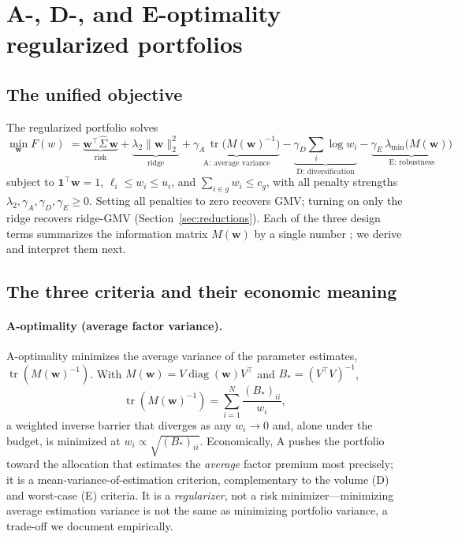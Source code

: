 \documentclass[11pt]{article}
\newcommand{\Sighat}{\hat\Sigma}
\newcommand{\tr}{\operatorname{tr}}
\newcommand{\diag}{\operatorname{diag}}
\newcommand{\one}{\mathbf{1}}
\newcommand{\w}{\mathbf{w}}
\newcommand{\M}{M(\w)}
\newcommand{\lammin}{\lambda_{\min}}
\begin{document}
\section{A-, D-, and E-optimality regularized portfolios}
\label{sec:criteria}
\subsection{The unified objective}
The regularized portfolio solves
\begin{equation}
  \min_{\w} F(w) \; =
  \underbrace{\w^\top\Sighat\,\w}_{\text{risk}}
  +\underbrace{\lambda_2\lVert\w\rVert_2^2}_{\text{ridge}}
  +\underbrace{\gamma_A\,\tr\!\big(\M^{-1}\big)}_{\text{A: average variance}}
  -\underbrace{\gamma_D\textstyle\sum_i\log w_i}_{\text{D: diversification}}
  -\underbrace{\gamma_E\,\lammin\!\big(\M\big)}_{\text{E: robustness}}
  \label{eq:objective}
\end{equation}
subject to $\one^\top\w=1$, $\ell_i\le w_i\le u_i$, and $\sum_{i\in g}w_i\le c_g$,
with all penalty strengths $\lambda_2,\gamma_A,\gamma_D,\gamma_E\ge0$. Setting all
penalties to zero recovers GMV; turning on only the ridge recovers ridge-GMV
(Section~\ref{sec:reductions}). Each of the three design terms summarizes the
information matrix $\M$ by a single number \cite{bergerwong}; we derive and
interpret them next.

\subsection{The three criteria and their economic meaning}
\paragraph{A-optimality (average factor variance).} A-optimality minimizes the
average variance of the parameter estimates, $\tr(\M^{-1})$. With
$\M=V\diag(\w)V^\top$ and $B_{\!*}=(V^\top V)^{-1}$,
\[
  \tr(\M^{-1})=\sum_{i=1}^{N}\frac{(B_{\!*})_{ii}}{w_i},
\]
a weighted inverse barrier that diverges as any $w_i\to0$ and, alone under the
budget, is minimized at $w_i\propto\sqrt{(B_{\!*})_{ii}}$. Economically, A pushes
the portfolio toward the allocation that estimates the \emph{average} factor
premium most precisely; it is a mean-variance-of-estimation criterion,
complementary to the volume (D) and worst-case (E) criteria. It is a
\emph{regularizer}, not a risk minimizer---minimizing average estimation variance
is not the same as minimizing portfolio variance, a trade-off we document
empirically.
\end{document}
